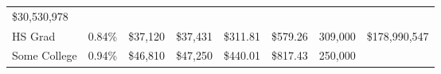 \documentclass[11pt]{article}
\begin{document}
\begin{longtable}[]{@{}llllllll@{}}
\begin{minipage}[t]{0.08\columnwidth}
\$30,530,978\strut
\end{minipage}\tabularnewline
\begin{minipage}[t]{0.13\columnwidth}\raggedright
HS Grad\strut
\end{minipage} & \begin{minipage}[t]{0.14\columnwidth}\raggedright
0.84\%\strut
\end{minipage} & \begin{minipage}[t]{0.09\columnwidth}\raggedright
\$37,120\strut
\end{minipage} & \begin{minipage}[t]{0.09\columnwidth}\raggedright
\$37,431\strut
\end{minipage} & \begin{minipage}[t]{0.08\columnwidth}\raggedright
\$311.81\strut
\end{minipage} & \begin{minipage}[t]{0.08\columnwidth}\raggedright
\$579.26\strut
\end{minipage} & \begin{minipage}[t]{0.08\columnwidth}\raggedright
309,000\strut
\end{minipage} & \begin{minipage}[t]{0.08\columnwidth}\raggedright
\$178,990,547\strut
\end{minipage}\tabularnewline
\begin{minipage}[t]{0.13\columnwidth}\raggedright
Some College\strut
\end{minipage} & \begin{minipage}[t]{0.14\columnwidth}\raggedright
0.94\%\strut
\end{minipage} & \begin{minipage}[t]{0.09\columnwidth}\raggedright
\$46,810\strut
\end{minipage} & \begin{minipage}[t]{0.09\columnwidth}\raggedright
\$47,250\strut
\end{minipage} & \begin{minipage}[t]{0.08\columnwidth}\raggedright
\$440.01\strut
\end{minipage} & \begin{minipage}[t]{0.08\columnwidth}\raggedright
\$817.43\strut
\end{minipage} & \begin{minipage}[t]{0.08\columnwidth}\raggedright
250,000\strut
\end{minipage} & \begin{minipage}[t]{0.08\columnwidth}\raggedright

\end{minipage}
\end{longtable}
\end{document}
